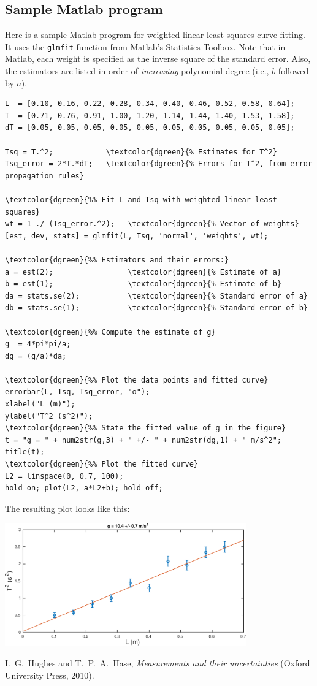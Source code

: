 \documentclass[11pt,a4paper]{article}
\begin{document}
\subsection{Sample Matlab program}

Here is a sample Matlab program for weighted linear least squares
curve fitting.  It uses the
\href{https://www.mathworks.com/help/stats/glmfit.html}{\texttt{glmfit}}
function from Matlab's
\href{https://www.mathworks.com/help/stats/index.html}{Statistics
  Toolbox}.  Note that in Matlab, each weight is specified as the
inverse square of the standard error.  Also, the estimators are listed
in order of \textit{increasing} polynomial degree (i.e., $b$ followed
by $a$).

\begin{Verbatim}[frame=single,baselinestretch=1,fontsize=\small,commandchars=\\\{\}]
L  = [0.10, 0.16, 0.22, 0.28, 0.34, 0.40, 0.46, 0.52, 0.58, 0.64];
T  = [0.71, 0.76, 0.91, 1.00, 1.20, 1.14, 1.44, 1.40, 1.53, 1.58];
dT = [0.05, 0.05, 0.05, 0.05, 0.05, 0.05, 0.05, 0.05, 0.05, 0.05];

Tsq = T.^2;            \textcolor{dgreen}{% Estimates for T^2}
Tsq_error = 2*T.*dT;   \textcolor{dgreen}{% Errors for T^2, from error propagation rules}

\textcolor{dgreen}{%% Fit L and Tsq with weighted linear least squares}
wt = 1 ./ (Tsq_error.^2);   \textcolor{dgreen}{% Vector of weights}
[est, dev, stats] = glmfit(L, Tsq, 'normal', 'weights', wt);

\textcolor{dgreen}{%% Estimators and their errors:}
a = est(2);                 \textcolor{dgreen}{% Estimate of a}
b = est(1);                 \textcolor{dgreen}{% Estimate of b}
da = stats.se(2);           \textcolor{dgreen}{% Standard error of a}
db = stats.se(1);           \textcolor{dgreen}{% Standard error of b}

\textcolor{dgreen}{%% Compute the estimate of g}
g  = 4*pi*pi/a;
dg = (g/a)*da;

\textcolor{dgreen}{%% Plot the data points and fitted curve}
errorbar(L, Tsq, Tsq_error, "o");
xlabel("L (m)");
ylabel("T^2 (s^2)");
\textcolor{dgreen}{%% State the fitted value of g in the figure}
t = "g = " + num2str(g,3) + " +/- " + num2str(dg,1) + " m/s^2";
title(t);
\textcolor{dgreen}{%% Plot the fitted curve}
L2 = linspace(0, 0.7, 100);
hold on; plot(L2, a*L2+b); hold off;
\end{Verbatim}
The resulting plot looks like this:
\begin{center}
  \includegraphics[width=0.78\textwidth]{errormatlab.pdf}
\end{center}

\begin{thebibliography}{99}
 I.~G.~Hughes and T.~P.~A.~Hase, \textit{Measurements
  and their uncertainties} (Oxford University Press, 2010).
\end{thebibliography}
\end{document}
